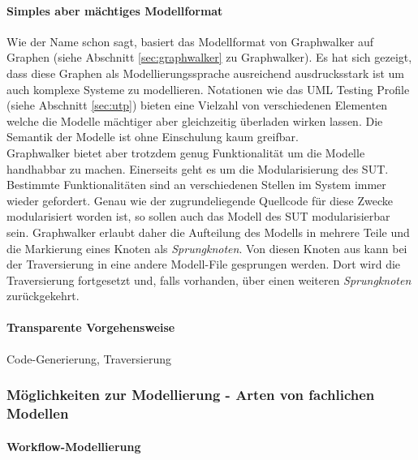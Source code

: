 \paragraph{Simples aber mächtiges Modellformat} Wie der Name schon sagt, basiert das Modellformat von Graphwalker auf Graphen (siehe Abschnitt \ref{sec:graphwalker} zu Graphwalker). Es hat sich gezeigt, dass diese Graphen als Modellierungssprache ausreichend ausdrucksstark ist um auch komplexe Systeme zu modellieren. Notationen wie das UML Testing Profile (siehe Abschnitt \ref{sec:utp}) bieten eine Vielzahl von verschiedenen Elementen welche die Modelle mächtiger aber gleichzeitig überladen wirken lassen. Die Semantik der Modelle ist ohne Einschulung kaum greifbar.\\
Graphwalker bietet aber trotzdem genug Funktionalität um die Modelle handhabbar zu machen. Einerseits geht es um die Modularisierung des SUT. Bestimmte Funktionalitäten sind an verschiedenen Stellen im System immer wieder gefordert. Genau wie der zugrundeliegende Quellcode für diese Zwecke modularisiert worden ist, so sollen auch das Modell des SUT modularisierbar sein. Graphwalker erlaubt daher die Aufteilung des Modells in mehrere Teile und die Markierung eines Knoten als \textit{Sprungknoten}. Von diesen Knoten aus kann bei der Traversierung in eine andere Modell-File gesprungen werden. Dort wird die Traversierung fortgesetzt und, falls vorhanden, über einen weiteren \textit{Sprungknoten} zurückgekehrt.

\paragraph{Transparente Vorgehensweise} Code-Generierung, Traversierung

\subsubsection{Möglichkeiten zur Modellierung - Arten von fachlichen Modellen}
\paragraph{Workflow-Modellierung}

